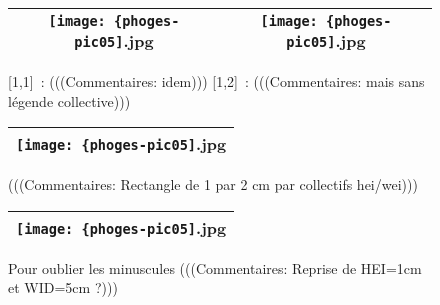 \documentclass[12pt,twocolumn,french]{article}
\begin{document}
  \begin{figure}[H]
    \caption{
      [1,1]~: 
      (((Commentaires: idem)))
      [1,2]~: 
      (((Commentaires: mais sans légende collective)))
    }
    \vspace{4mm}
    \label{phoges-pic05.jpg}
    \noindent \centering{}
    \begin{tabular}{|c|c|}
      \hline
          \texttt{[image: \{phoges-pic05]}.jpg}
        &
          \texttt{[image: \{phoges-pic05]}.jpg}
        \tabularnewline \hline
    \end{tabular}
  \end{figure}

  \begin{figure}[H]
    \caption{
      (((Commentaires: Rectangle de 1 par 2 cm par collectifs hei/wei)))
    }
    \vspace{4mm}
    \label{phoges-pic05.jpg}
    \noindent \centering{}
    \begin{tabular}{|c|}
      \hline
          \texttt{[image: \{phoges-pic05]}.jpg}
        \tabularnewline \hline
    \end{tabular}
  \end{figure}

  \begin{figure}[H]
    \caption{
      Pour oublier les minuscules
      (((Commentaires: Reprise de HEI=1cm et WID=5cm ?)))
    }
    \vspace{4mm}
    \label{phoges-pic05.jpg}
    \noindent \centering{}
    \begin{tabular}{|c|}
      \hline
          \texttt{[image: \{phoges-pic05]}.jpg}
        \tabularnewline \hline
    \end{tabular}
  \end{figure}
\end{document}
